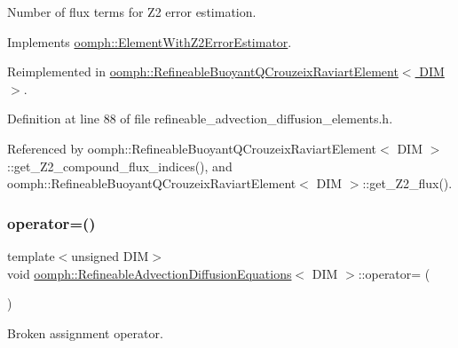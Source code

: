 Number of \textquotesingle{}flux\textquotesingle{} terms for Z2 error estimation. 



Implements \hyperlink{classoomph_1_1ElementWithZ2ErrorEstimator_ae82c5728902e13da31be19c390fc28e3}{oomph\+::\+Element\+With\+Z2\+Error\+Estimator}.



Reimplemented in \hyperlink{classoomph_1_1RefineableBuoyantQCrouzeixRaviartElement_a630b9aa6c5cf924d32996e89ed230175}{oomph\+::\+Refineable\+Buoyant\+Q\+Crouzeix\+Raviart\+Element$<$ D\+I\+M $>$}.



Definition at line 88 of file refineable\+\_\+advection\+\_\+diffusion\+\_\+elements.\+h.



Referenced by oomph\+::\+Refineable\+Buoyant\+Q\+Crouzeix\+Raviart\+Element$<$ D\+I\+M $>$\+::get\+\_\+\+Z2\+\_\+compound\+\_\+flux\+\_\+indices(), and oomph\+::\+Refineable\+Buoyant\+Q\+Crouzeix\+Raviart\+Element$<$ D\+I\+M $>$\+::get\+\_\+\+Z2\+\_\+flux().

\mbox{\label{classoomph_1_1RefineableAdvectionDiffusionEquations_aad3eeaeb0c18b6723939e7654541bfb2}} 
\subsubsection{\texorpdfstring{operator=()}{operator=()}}
{\footnotesize\ttfamily template$<$unsigned D\+IM$>$ \\
void \hyperlink{classoomph_1_1RefineableAdvectionDiffusionEquations}{oomph\+::\+Refineable\+Advection\+Diffusion\+Equations}$<$ D\+IM $>$\+::operator= (\begin{DoxyParamCaption}\item[{const \hyperlink{classoomph_1_1RefineableAdvectionDiffusionEquations}{Refineable\+Advection\+Diffusion\+Equations}$<$ D\+IM $>$ \&}]{ }\end{DoxyParamCaption})\hspace{0.3cm}{\ttfamily [inline]}}



Broken assignment operator. 



